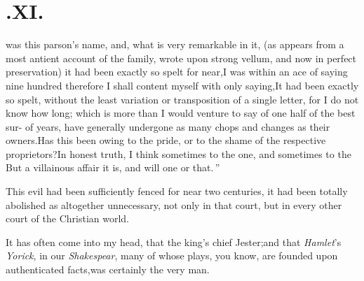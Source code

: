 \documentclass{article}
\begin{document}
\null
\section{.\enspace XI.}

 was this parson’s name, and,\break
what is very remarkable in it, (as\break
appears from a most antient account of\break
the family, wrote upon strong vellum, and
now in perfect preservation) it had been exactly so spelt for near,\tsk I was
within an ace of saying nine hundred\break
{}
therefore I
shall content myself with only saying,\tsh It had been exactly so spelt, without the
least variation or transposition of a single letter, for I do not know how long;
which is more than I would venture to say of one half of the best sur-\break 
{} of years, have generally undergone as many chops and
changes as their owners.\tsk Has this been owing to the pride, or to the shame of
the respective proprietors?\tsk In honest truth, I think sometimes to the one, and
sometimes to the  But a villainous affair
it is, and will one 
\lqq or that.\,” 

\vspace\parskip
This evil had been sufficiently fenced 
for near two centuries, it had been totally 
abolished as altogether unnecessary, not only in that
court, but in every other court of the Christian world.

It has often come into my head, that 
the king’s chief Jester;\tsk and that
\textit{Hamlet}’s \textit{Yorick}, in our \textit{Shakespear},
many of whose plays, you know, are founded up\-on authenticated
facts,\tsk was certainly the very man.
\end{document}
